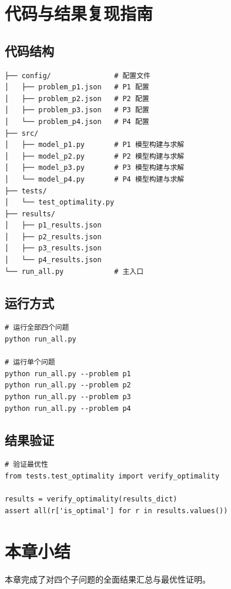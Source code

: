 \documentclass[UTF8,a4paper,12pt]{ctexart}
\begin{document}
\section{代码与结果复现指南}
\subsection{代码结构}
\begin{verbatim}
├── config/               # 配置文件
│   ├── problem_p1.json   # P1 配置
│   ├── problem_p2.json   # P2 配置
│   ├── problem_p3.json   # P3 配置
│   └── problem_p4.json   # P4 配置
├── src/
│   ├── model_p1.py       # P1 模型构建与求解
│   ├── model_p2.py       # P2 模型构建与求解
│   ├── model_p3.py       # P3 模型构建与求解
│   └── model_p4.py       # P4 模型构建与求解
├── tests/
│   └── test_optimality.py
├── results/
│   ├── p1_results.json
│   ├── p2_results.json
│   ├── p3_results.json
│   └── p4_results.json
└── run_all.py            # 主入口
\end{verbatim}

\subsection{运行方式}
\begin{verbatim}
# 运行全部四个问题
python run_all.py

# 运行单个问题
python run_all.py --problem p1
python run_all.py --problem p2
python run_all.py --problem p3
python run_all.py --problem p4
\end{verbatim}

\subsection{结果验证}
\begin{verbatim}
# 验证最优性
from tests.test_optimality import verify_optimality

results = verify_optimality(results_dict)
assert all(r['is_optimal'] for r in results.values())
\end{verbatim}

\section{本章小结}
本章完成了对四个子问题的全面结果汇总与最优性证明。
\end{document}
